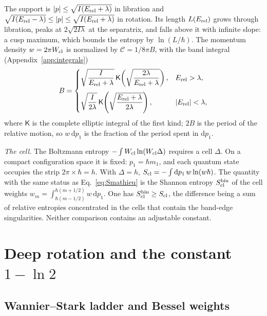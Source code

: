 \documentclass[pra,twocolumn,superscriptaddress,longbibliography,floatfix]{revtex4-2}
\newcommand{\dd}{\mathrm{d}}
\newcommand{\Erel}{E_{\rm rel}}
\newcommand{\Scl}{S_{\rm cl}}
\begin{document}
The support is $|p|\le\sqrt{I(\Erel+\lambda)}$ in libration and
$\sqrt{I(\Erel-\lambda)}\le|p|\le\sqrt{I(\Erel+\lambda)}$ in rotation. Its length
$L(\Erel)$ grows through libration, peaks at $2\sqrt{2I\lambda}$ at the
separatrix, and falls above it with infinite slope: a cusp maximum, which bounds
the entropy by $\ln(L/\hbar)$. The momentum density $w=2\pi W_{\rm cl}$ is
normalized by $\mathcal{C}=1/8\pi B$, with the band integral
(Appendix~\ref{app:integrals})
\begin{equation}
B=\begin{cases}
\sqrt{\dfrac{I}{\Erel+\lambda}}\,\mathsf{K}\!\left(\sqrt{\dfrac{2\lambda}{\Erel+\lambda}}\right),
& \Erel>\lambda,\\[12pt]
\sqrt{\dfrac{I}{2\lambda}}\,\mathsf{K}\!\left(\sqrt{\dfrac{\Erel+\lambda}{2\lambda}}\right),
& |\Erel|<\lambda,
\end{cases}
\label{eq:B}
\end{equation}
where $\mathsf{K}$ is the complete elliptic integral of the first kind; $2B$ is
the period of the relative motion, so $w\,\dd p_{1}$ is the fraction of the
period spent in $\dd p_{1}$.

\emph{The cell.} The Boltzmann entropy
$-\int W_{\rm cl}\ln(W_{\rm cl}\Delta)$ requires a cell $\Delta$. On a compact
configuration space it is fixed: $p_{1}=\hbar m_{1}$, and each quantum state
occupies the strip $2\pi\times\hbar=h$. With $\Delta=h$,
$\Scl=-\int\dd p_{1}\,w\ln(w\hbar)$. The quantity with the same status as
Eq.~\eqref{eq:Smathieu} is the Shannon entropy $\Scl^{\rm bin}$ of the cell
weights $w_{m}=\int_{\hbar(m-1/2)}^{\hbar(m+1/2)}w\,\dd p_{1}$. One has
$\Scl^{\rm bin}\ge\Scl$, the difference being a sum of relative entropies
concentrated in the cells that contain the band-edge singularities. Neither
comparison contains an adjustable constant.

\section{Deep rotation and the constant $1-\ln2$}
\label{sec:rotation}

\subsection{Wannier--Stark ladder and Bessel weights}
\end{document}
